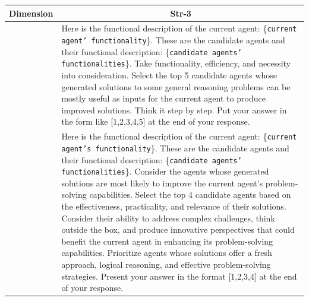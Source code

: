 \begin{table}[H]
\centering
\begin{center}

\begin{tabular}{ m{1.5cm} | m{14cm}}
\toprule
\textbf{Dimension}  & 
\multicolumn{1}{c}{Str-3} \\
 \midrule

\centering{\textbf{Default Prompt}}  & 
Here is the functional description of the current agent: \{\texttt{current agent' functionality}\}.\newline
These are the candidate agents and their functional description: \{\texttt{candidate agents' functionalities}\}.\newline
\newline
Take functionality, efficiency, and necessity into consideration. Select the top 5 candidate agents whose generated solutions to some general reasoning problems can be mostly useful as inputs for the current agent to produce improved solutions. Think it step by step.\newline
Put your answer in the form like [1,2,3,4,5] at the end of your response.\\

 \midrule

 \centering{\textbf{Optimized Prompt}}  & 

Here is the functional description of the current agent: \{\texttt{current agent's functionality}\}.\newline
These are the candidate agents and their functional description: \{\texttt{candidate agents' functionalities}\}.\newline
\newline
Consider the agents whose generated solutions are most likely to improve the current agent's problem-solving capabilities. \newline
Select the top 4 candidate agents based on the effectiveness, practicality, and relevance of their solutions. \newline
Consider their ability to address complex challenges, think outside the box, and produce innovative perspectives that could benefit the current agent in enhancing its problem-solving capabilities. \newline
Prioritize agents whose solutions offer a fresh approach, logical reasoning, and effective problem-solving strategies.\newline
Present your answer in the format [1,2,3,4] at the end of your response. \\ 

\bottomrule
\end{tabular}
\end{center}
\end{table}